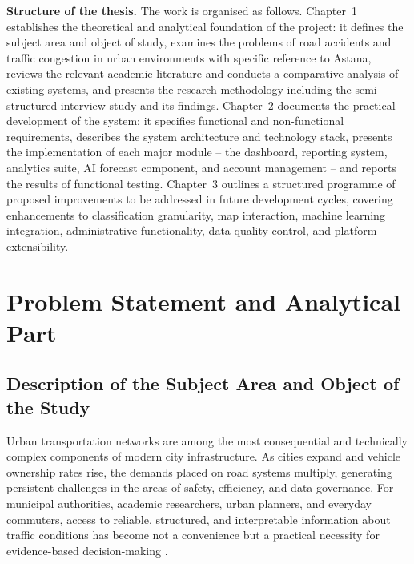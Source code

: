 \documentclass[12pt,a4paper]{report}
\begin{document}
\textbf{Structure of the thesis.} The work is organised as follows. Chapter~1 establishes the theoretical and analytical foundation of the project: it defines the subject area and object of study, examines the problems of road accidents and traffic congestion in urban environments with specific reference to Astana, reviews the relevant academic literature and conducts a comparative analysis of existing systems, and presents the research methodology including the semi-structured interview study and its findings. Chapter~2 documents the practical development of the system: it specifies functional and non-functional requirements, describes the system architecture and technology stack, presents the implementation of each major module -- the dashboard, reporting system, analytics suite, AI forecast component, and account management -- and reports the results of functional testing. Chapter~3 outlines a structured programme of proposed improvements to be addressed in future development cycles, covering enhancements to classification granularity, map interaction, machine learning integration, administrative functionality, data quality control, and platform extensibility.

\clearpage

\setcounter{page}{1}

\chapter{Problem Statement and Analytical Part}

\section{Description of the Subject Area and Object of the Study}

Urban transportation networks are among the most consequential and
technically complex components of modern city infrastructure.
As cities expand and vehicle ownership rates rise, the demands placed on
road systems multiply, generating persistent challenges in the areas of
safety, efficiency, and data governance. For municipal authorities,
academic researchers, urban planners, and everyday commuters, access to
reliable, structured, and interpretable information about traffic
conditions has become not a convenience but a practical necessity for
evidence-based decision-making \cite{who2023}.
\end{document}
